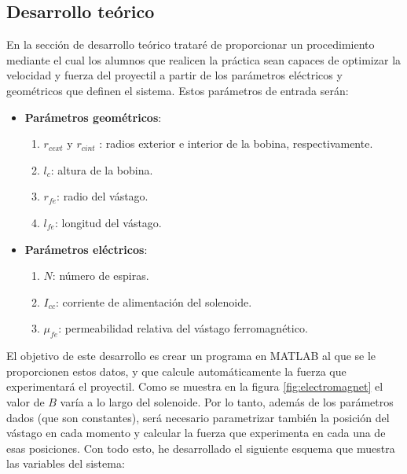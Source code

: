 \subsection{Desarrollo teórico}
\label{subsec:desarrollo}
En la sección de desarrollo teórico trataré de proporcionar un procedimiento mediante el cual los alumnos que realicen la práctica sean capaces de optimizar la velocidad y fuerza del proyectil a partir de los parámetros eléctricos y geométricos que definen el sistema. Estos parámetros de entrada serán:
\begin{itemize}
    \item \textbf{Parámetros geométricos}:
    \begin{enumerate}[label=\alph*., leftmargin=*, itemindent=1em]
        \item \(r_{cext}\) y \(r_{cint} \) : radios exterior e interior de la bobina, respectivamente.
        \item \(l_c\): altura de la bobina.
        \item \(r_{fe}\): radio del vástago.
        \item \(l_{fe}\): longitud del vástago.
    \end{enumerate}
    \item \textbf{Parámetros eléctricos}:
    \begin{enumerate}[label=\alph*., leftmargin=*, itemindent=1em]
        \item \(N\): número de espiras.
        \item \(I_{cc}\): corriente de alimentación del solenoide.
        \item \(\mu_{fe}\): permeabilidad relativa del vástago ferromagnético.
    \end{enumerate}
\end{itemize}

El objetivo de este desarrollo es crear un programa en MATLAB al que se le proporcionen estos datos, y que calcule automáticamente la fuerza que experimentará el proyectil. Como se muestra en la figura \ref{fig:electromagnet} el valor de
\(B\) varía a lo largo del solenoide. Por lo tanto, además de los parámetros dados (que son constantes), será necesario parametrizar también la posición del vástago en cada momento y calcular la fuerza que experimenta en cada una de esas posiciones. Con todo esto, he desarrollado el siguiente esquema que muestra las variables del sistema:

